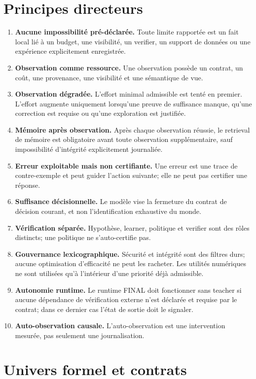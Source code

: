 \documentclass[11pt,a4paper]{report}
\begin{document}
\chapter{Principes directeurs}
\begin{enumerate}
\item \textbf{Aucune impossibilité pré-déclarée.} Toute limite rapportée est un fait local lié à un budget, une visibilité, un verifier, un support de données ou une expérience explicitement enregistrée.
\item \textbf{Observation comme ressource.} Une observation possède un contrat, un coût, une provenance, une visibilité et une sémantique de vue.
\item \textbf{Observation dégradée.} L'effort minimal admissible est tenté en premier. L'effort augmente uniquement lorsqu'une preuve de suffisance manque, qu'une correction est requise ou qu'une exploration est justifiée.
\item \textbf{Mémoire après observation.} Après chaque observation réussie, le retrieval de mémoire est obligatoire avant toute observation supplémentaire, sauf impossibilité d'intégrité explicitement journaliée.
\item \textbf{Erreur exploitable mais non certifiante.} Une erreur est une trace de contre-exemple et peut guider l'action suivante; elle ne peut pas certifier une réponse.
\item \textbf{Suffisance décisionnelle.} Le modèle vise la fermeture du contrat de décision courant, et non l'identification exhaustive du monde.
\item \textbf{Vérification séparée.} Hypothèse, learner, politique et verifier sont des rôles distincts; une politique ne s'auto-certifie pas.
\item \textbf{Gouvernance lexicographique.} Sécurité et intégrité sont des filtres durs; aucune optimisation d'efficacité ne peut les racheter. Les utilités numériques ne sont utilisées qu'à l'intérieur d'une priorité déjà admissible.
\item \textbf{Autonomie runtime.} Le runtime FINAL doit fonctionner sans teacher si aucune dépendance de vérification externe n'est déclarée et requise par le contrat; dans ce dernier cas l'état de sortie doit le signaler.
\item \textbf{Auto-observation causale.} L'auto-observation est une intervention mesurée, pas seulement une journalisation.
\end{enumerate}

\chapter{Univers formel et contrats}
\end{document}
